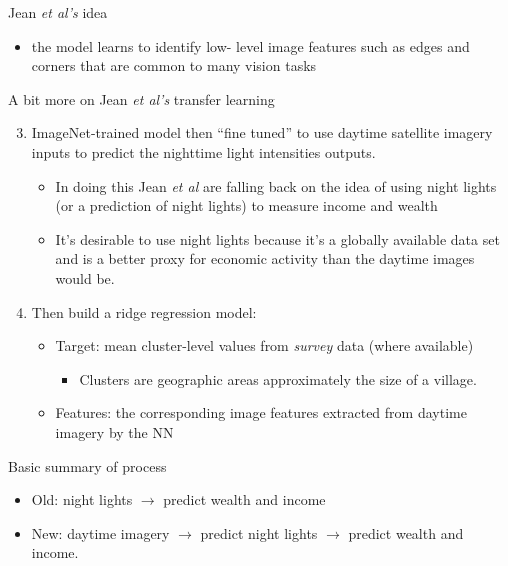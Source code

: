 \documentclass[mathserif, aspectratio=169]{beamer}
\begin{document}
\begin{frame}{Jean \textit{et al's} idea}
\begin{enumerate}
\begin{itemize}
\item the model learns to identify low- level image features such as edges and corners that are common to many vision tasks
\end{itemize}
\end{enumerate}
\end{frame}

\begin{frame}{A bit more on Jean \textit{et al's} transfer learning}
\begin{enumerate}
 \setcounter{enumi}{2}
\item ImageNet-trained model then ``fine tuned'' to use daytime satellite imagery inputs to predict the nighttime light intensities outputs.
\begin{itemize}
\item In doing this Jean\textit{ et al} are falling back on the idea of using night lights (or a prediction of night lights) to measure income and wealth
\item It's desirable to use night lights because it's a globally available data set and is a better proxy for economic activity than the daytime images would be.
\end{itemize}
\item Then build a ridge regression model:
\begin{itemize}
	\item Target: mean cluster-level values from \textit{survey} data (where available) 
	\begin{itemize}
		\item Clusters are geographic areas approximately the size of a village.
	\end{itemize}
	\item Features: the corresponding image features extracted from daytime imagery by the NN 
\end{itemize}
\end{enumerate}
\end{frame}

\begin{frame}{Basic summary of process}

\begin{itemize}
\item Old: night lights $\rightarrow $ predict wealth and income
\item New: daytime imagery $\rightarrow$ predict night lights $\rightarrow$ predict wealth and income.
\end{itemize}

\end{frame}
\end{document}
